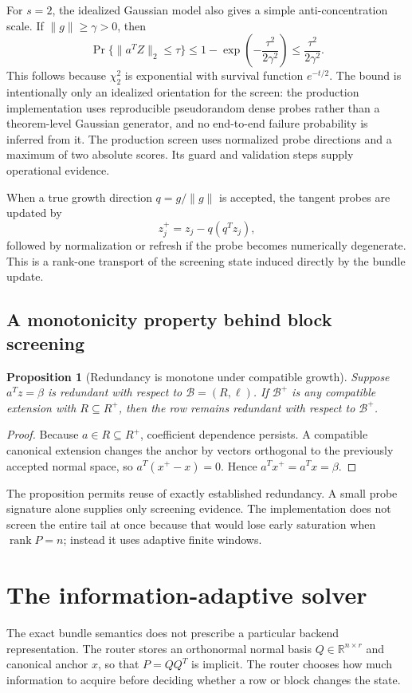 \documentclass[11pt]{article}
\newtheorem{proposition}[theorem]{Proposition}
\theoremstyle{definition}
\newcommand{\R}{\mathbb{R}}
\newcommand{\Bun}{\mathcal{B}}
\newcommand{\rank}{\operatorname{rank}}
\begin{document}
For $s=2$, the idealized Gaussian model also gives a simple anti-concentration scale. If $\|g\|\ge\gamma>0$, then
\[
\Pr\{\|a^TZ\|_2\le\tau\}
\le 1-\exp\!\left(-\frac{\tau^2}{2\gamma^2}\right)
\le \frac{\tau^2}{2\gamma^2}.
\]
This follows because $\chi_2^2$ is exponential with survival function $e^{-t/2}$. The bound is intentionally only an idealized orientation for the screen: the production implementation uses reproducible pseudorandom dense probes rather than a theorem-level Gaussian generator, and no end-to-end failure probability is inferred from it. The production screen uses normalized probe directions and a maximum of two absolute scores. Its guard and validation steps supply operational evidence.

When a true growth direction \(q=g/\|g\|\) is accepted, the tangent probes are updated by
\[
z_j^+=z_j-q(q^Tz_j),
\]
followed by normalization or refresh if the probe becomes numerically degenerate. This is a rank-one transport of the screening state induced directly by the bundle update.

\subsection{A monotonicity property behind block screening}
\begin{proposition}[Redundancy is monotone under compatible growth]\label{prop:monotone}
Suppose \(a^Tz=\beta\) is redundant with respect to \(\Bun=(R,\ell)\). If \(\Bun^+\) is any compatible extension with \(R\subseteq R^+\), then the row remains redundant with respect to \(\Bun^+\).
\end{proposition}

\begin{proof}
Because \(a\in R\subseteq R^+\), coefficient dependence persists. A compatible canonical extension changes the anchor by vectors orthogonal to the previously accepted normal space, so \(a^T(x^+-x)=0\). Hence \(a^Tx^+=a^Tx=\beta\).
\end{proof}

The proposition permits reuse of exactly established redundancy. A small probe signature alone supplies only screening evidence. The implementation does not screen the entire tail at once because that would lose early saturation when \(\rank P=n\); instead it uses adaptive finite windows.

\section{The information-adaptive solver}\label{sec:solver}
The exact bundle semantics does not prescribe a particular backend representation. The router stores an orthonormal normal basis \(Q\in\R^{n\times r}\) and canonical anchor \(x\), so that \(P=QQ^T\) is implicit. The router chooses how much information to acquire before deciding whether a row or block changes the state.
\end{document}
